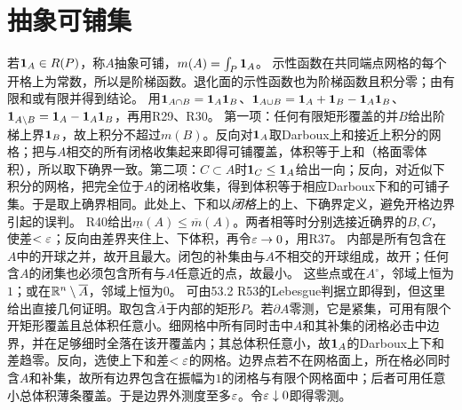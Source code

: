 \documentclass[UTF8,fontset=fandol,11pt]{ctexart}
\begin{document}
\section{抽象可铺集}
若$\mathbf1_A\in R(P)$，称$A$抽象可铺，$m(A)=\int_P\mathbf1_A$。
示性函数在共同端点网格的每个开格上为常数，所以是阶梯函数。退化面的示性函数也为阶梯函数且积分零；由有限和或有限并得到结论。
用$\mathbf1_{A\cap B}=\mathbf1_A\mathbf1_B$、$\mathbf1_{A\cup B}=\mathbf1_A+\mathbf1_B-\mathbf1_A\mathbf1_B$、$\mathbf1_{A\setminus B}=\mathbf1_A-\mathbf1_A\mathbf1_B$，再用R29、R30。
第一项：任何有限矩形覆盖的并$B$给出阶梯上界$\mathbf1_B$，故上积分不超过$m(B)$。反向对$\mathbf1_A$取Darboux上和接近上积分的网格；把与$A$相交的所有闭格收集起来即得可铺覆盖，体积等于上和（格面零体积），所以取下确界一致。第二项：$C\subset A$时$\mathbf1_C\le\mathbf1_A$给出一向；反向，对近似下积分的网格，把完全位于$A$的闭格收集，得到体积等于相应Darboux下和的可铺子集。于是取上确界相同。此处上、下和以\emph{闭格}上的上、下确界定义，避免开格边界引起的误判。
R40给出$\underline m(A)\le\overline m(A)$。两者相等时分别选接近确界的$B,C$，使差$<\varepsilon$；反向由差界夹住上、下体积，再令$\varepsilon\to0$，用R37。
内部是所有包含在$A$中的开球之并，故开且最大。闭包的补集由与$A$不相交的开球组成，故开；任何含$A$的闭集也必须包含所有与$A$任意近的点，故最小。
这些点或在$A^\circ$，邻域上恒为$1$；或在$\mathbb R^n\setminus\overline A$，邻域上恒为$0$。
可由53.2 R53的Lebesgue判据立即得到，但这里给出直接几何证明。取包含$\overline A$于内部的矩形$P$。若$\partial A$零测，它是紧集，可用有限个开矩形覆盖且总体积任意小。细网格中所有同时击中$A$和其补集的闭格必击中边界，并在足够细时全落在该开覆盖内；其总体积任意小，故$\mathbf1_A$的Darboux上下和差趋零。反向，选使上下和差$<\varepsilon$的网格。边界点若不在网格面上，所在格必同时含$A$和补集，故所有边界包含在振幅为$1$的闭格与有限个网格面中；后者可用任意小总体积薄条覆盖。于是边界外测度至多$\varepsilon$。令$\varepsilon\downarrow0$即得零测。
\end{document}
